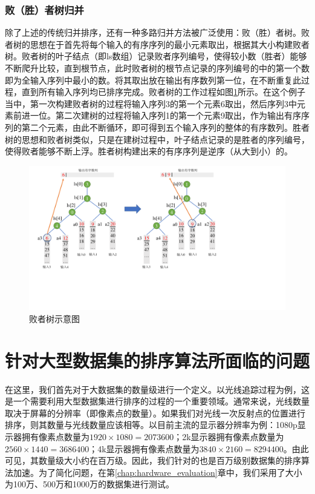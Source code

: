 \subsubsection{败（胜）者树归并}
除了上述的传统归并排序，还有一种多路归并方法被广泛使用：败（胜）者树。败者树的思想在于首先将每个输入的有序序列的最小元素取出，根据其大小构建败者树。败者树的叶子结点（即ls数组）记录败者序列编号，使得较小数（胜者）能够不断爬升比较，直到根节点，此时败者树的根节点记录的序列编号的中的第一个数即为全输入序列中最小的数。将其取出放在输出有序数列第一位，在不断重复此过程，直到所有输入序列均已排序完成。败者树的工作过程如图\ref{fig:loser_tree}所示。在这个例子当中，第一次构建败者树的过程将输入序列3的第一个元素6取出，然后序列3中元素前进一位。第二次建树的过程将输入序列1的第一个元素9取出，作为输出有序序列的第二个元素，由此不断循环，即可得到五个输入序列的整体的有序数列。胜者树的思想和败者树类似，只是在建树过程中，叶子结点记录的是胜者的序列编号，使得败者能够不断上浮。胜者树构建出来的有序序列是逆序（从大到小）的。
\begin{figure}[htbp]
    \centering
    \includegraphics[width=\linewidth]{figures/loser_tree.pdf}
    \caption{败者树示意图}
    \label{fig:loser_tree}
\end{figure}


\section{针对大型数据集的排序算法所面临的问题}\label{facing_problems}

在这里，我们首先对于大数据集的数量级进行一个定义。以光线追踪过程为例，这是一个需要利用大型数据集进行排序的过程的一个重要领域。通常来说，光线数量取决于屏幕的分辨率（即像素点的数量）。如果我们对光线一次反射点的位置进行排序，则其数量与光线数量应该相等。以目前主流的显示器分辨率为例：1080p显示器拥有像素点数量为$1920\times 1080=2073600$；2k显示器拥有像素点数量为$2560\times1440=3686400$；4k显示器拥有像素点数量为$3840\times2160=8294400$。由此可见，其数量级大小约在百万级。因此，我们针对的也是百万级别数据集的排序算法加速。为了简化问题，在第\ref{chap:hardware_evaluation}章中，我们采用了大小为100万、500万和1000万的数据集进行测试。

